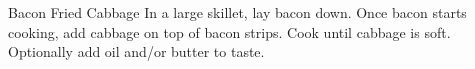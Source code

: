 \documentclass[../cookbook.tex]{subfiles}
\begin{document}
\begin{recipe}{Bacon Fried Cabbage}{}{}
    In a large skillet, lay bacon down.
    Once bacon starts cooking, add cabbage on
    top of bacon strips. Cook until cabbage is soft.
    Optionally add oil and/or butter to taste.

\end{recipe}
\end{document}
